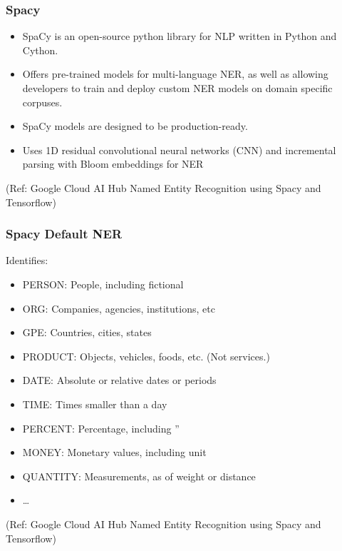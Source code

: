 \begin{frame}[fragile]\frametitle{Spacy}
  \begin{itemize}
  \item SpaCy is an open-source python library for NLP written in Python and Cython. 
	\item Offers pre-trained models for multi-language NER, as well as allowing developers to train and deploy custom NER models on domain specific corpuses. 
	\item SpaCy models are designed to be production-ready.
	\item Uses 1D residual convolutional neural networks (CNN) and incremental parsing with Bloom embeddings for NER
  \end{itemize}
	
	{\tiny (Ref: Google Cloud AI Hub Named Entity Recognition using Spacy and Tensorflow)}
\end{frame}

\begin{frame}[fragile]\frametitle{Spacy Default NER}
Identifies:
  \begin{itemize}
  \item PERSON:	People, including fictional
	\item ORG:	Companies, agencies, institutions, etc
	\item GPE:	Countries, cities, states
	\item PRODUCT:	Objects, vehicles, foods, etc. (Not services.)
	\item DATE:	Absolute or relative dates or periods
	\item TIME:	Times smaller than a day
	\item PERCENT:	Percentage, including ”%
	\item MONEY:	Monetary values, including unit
	\item QUANTITY:	Measurements, as of weight or distance
	\item \ldots
  \end{itemize}
	
	{\tiny (Ref: Google Cloud AI Hub Named Entity Recognition using Spacy and Tensorflow)}
\end{frame}

